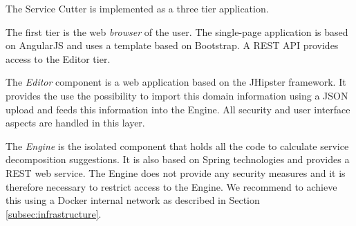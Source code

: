 \begin{minipage}[t]{0.5\textwidth}
\setlength{\parskip}{5pt plus 0.1pt}
	The Service Cutter is implemented as a three tier application.
	
	The first tier is the web \textit{browser} of the user. The single-page application is based on AngularJS\cite{angularjs} and uses a template based on Bootstrap\cite{bootstrap}. A REST API provides access to the Editor tier.
	
	The \textit{Editor} component is a web application based on the JHipster\cite{jhipster} framework. It provides the use the possibility to import this domain information using a JSON upload and feeds this information into the Engine. All security and user interface aspects are handled in this layer.
	
	The \textit{Engine} is the isolated component that holds all the code to calculate service decomposition suggestions. It is also based on Spring technologies and provides a REST web service. The Engine does not provide any security measures and it is therefore necessary to restrict access to the Engine. We recommend to achieve this using a Docker\cite{docker} internal network as described in Section \ref{subsec:infrastructure}.
	
	
\end{minipage}
